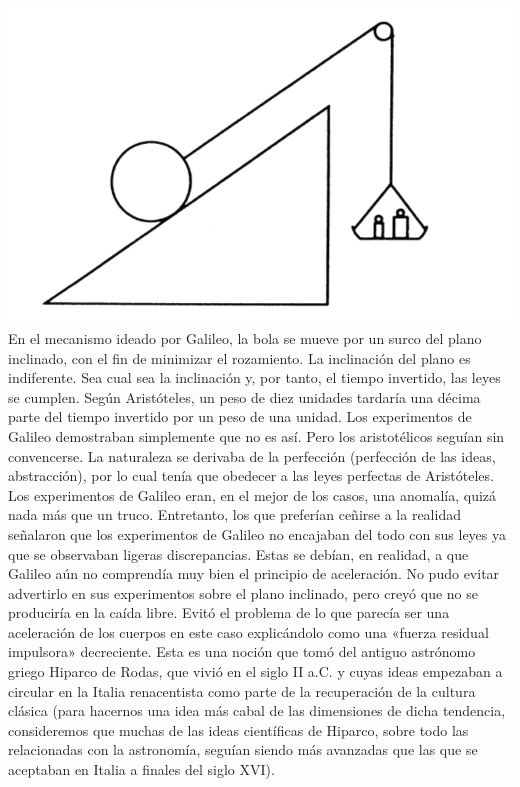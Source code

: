 \documentclass[letterpaper, 10pt, journal]{IEEEtran}
\begin{document}
\includegraphics[scale=0.4]{Galileo1}
\newline 
En el mecanismo ideado por Galileo, la bola se mueve por un surco del plano inclinado, con el fin de minimizar el rozamiento. La inclinación del plano es indiferente. Sea cual sea la inclinación y, por tanto, el tiempo invertido, las leyes se cumplen.
\newline
Según Aristóteles, un peso de diez unidades tardaría una décima parte del tiempo invertido por un peso de una unidad. Los experimentos de Galileo demostraban simplemente que no es así. Pero los aristotélicos seguían sin convencerse. La naturaleza se derivaba de la perfección (perfección de las ideas, abstracción), por lo cual tenía que obedecer a las leyes perfectas de Aristóteles. Los experimentos de Galileo eran, en el mejor de los casos, una anomalía, quizá nada más que un truco. Entretanto, los que preferían ceñirse a la realidad señalaron que los experimentos de Galileo no encajaban del todo con sus leyes ya que se observaban ligeras discrepancias. Estas se debían, en realidad, a que Galileo aún no comprendía muy bien el principio de aceleración. No pudo evitar advertirlo en sus experimentos sobre el plano inclinado, pero creyó que no se produciría en la caída libre. Evitó el problema de lo que parecía ser una aceleración de los cuerpos en este caso explicándolo como una «fuerza residual impulsora» decreciente. Esta es una noción que tomó del antiguo astrónomo griego Hiparco de Rodas, que vivió en el siglo II a.C. y cuyas ideas empezaban a circular en la Italia renacentista como parte de la recuperación de la cultura clásica (para hacernos una idea más cabal de las dimensiones de dicha tendencia, consideremos que muchas de las ideas científicas de Hiparco, sobre todo las relacionadas con la astronomía, seguían siendo más avanzadas que las que se aceptaban en Italia a finales del siglo XVI).
\end{document}

